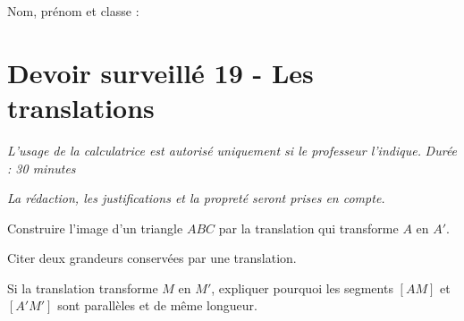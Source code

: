\documentclass[a4paper,10pt]{report}
\begin{document}
\pagestyle{empty}
\noindent Nom, prénom et classe : \dotfill

\section*{Devoir surveillé 19 - Les translations}

\noindent \textit{L'usage de la calculatrice est autorisé uniquement si le professeur l'indique.} \hfill \textit{Durée : 30 minutes}

\medskip
\noindent \textit{La rédaction, les justifications et la propreté seront prises en compte.}


\begin{ex}[Construction]
Construire l'image d'un triangle $ABC$ par la translation qui transforme $A$ en $A'$.
\medskip\noindent\grandscarreaux{\linewidth}{6cm}
\end{ex}
\begin{ex}[Propriétés]
Citer deux grandeurs conservées par une translation.
\medskip\noindent\grandscarreaux{\linewidth}{3cm}
\end{ex}
\begin{ex}[Raisonner]
Si la translation transforme $M$ en $M'$, expliquer pourquoi les segments $[AM]$ et $[A'M']$ sont parallèles et de même longueur.
\medskip\noindent\grandscarreaux{\linewidth}{4cm}
\end{ex}
\end{document}
